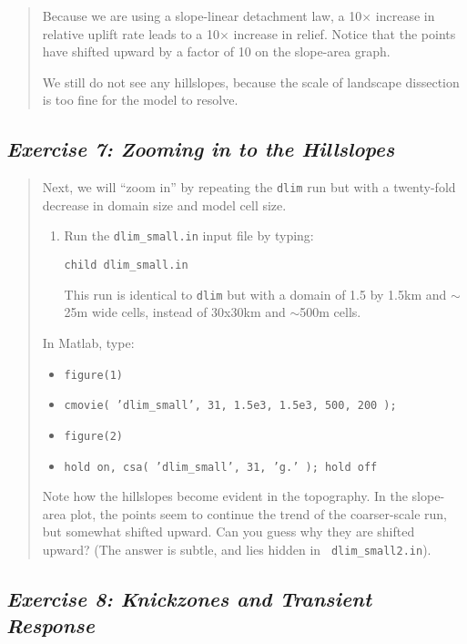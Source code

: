 \documentclass[12pt,reqno]{amsart}
\begin{document}
\begin{quote}
{Because we are using a slope-linear detachment law, a 10$\times$ increase in relative uplift rate leads to a 10$\times$ increase in relief. Notice that the points have shifted upward by a factor of 10 on the slope-area graph.

We still do not see any hillslopes, because the scale of landscape
dissection is too fine for the model to resolve. 
}
\end{quote}

\subsection*{\em Exercise 7: Zooming in to the Hillslopes}

\begin{quote}
\small
{\sf
Next, we will ``zoom in'' by repeating the {\tt dlim} run but with a twenty-fold decrease
in domain size and model cell size.

\begin{enumerate}
\item
Run the {\tt dlim\_small.in} input file by typing:

{\tt child dlim\_small.in}

This run is identical to {\tt dlim} but with a domain of 1.5 by 1.5km
and $\sim$25m wide cells, instead of 30x30km and $\sim$500m cells.
\end{enumerate}

\noindent 
In Matlab, type:
\begin{itemize}
\setcounter{enumi}{1}
\item
{\tt figure(1)}
\item
{\tt cmovie( 'dlim\_small', 31, 1.5e3, 1.5e3, 500, 200 );}
\item
{\tt figure(2)}
\item
{\tt hold on, csa( 'dlim\_small', 31, 'g.' ); hold off}
\end{itemize}

Note how the hillslopes become evident in the topography. In the
slope-area plot, the points seem to continue the trend of the
coarser-scale run, but somewhat shifted upward. Can you guess why they
are shifted upward? (The answer is subtle, and lies hidden in {\tt
  dlim\_small2.in}).
}
\end{quote}

\subsection*{\em Exercise 8: Knickzones and Transient Response}
\end{document}
